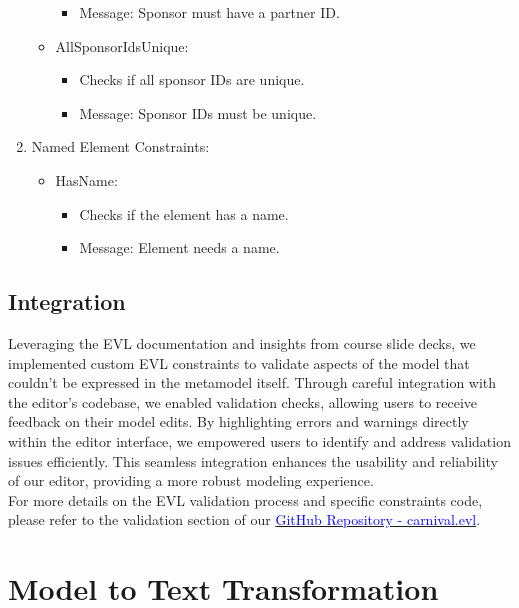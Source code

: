 \documentclass[a4paper,11pt]{report}
\begin{document}
\begin{enumerate}
\begin{itemize}
\begin{itemize}
			\item Message: Sponsor must have a partner ID.
		\end{itemize}
		\item AllSponsorIdsUnique:
		\begin{itemize}
			\item Checks if all sponsor IDs are unique.
			\item Message: Sponsor IDs must be unique.
		\end{itemize}
	\end{itemize}
	\item Named Element Constraints:
	\begin{itemize}
		\item HasName:
		\begin{itemize}
			\item Checks if the element has a name.
			\item Message: Element needs a name.
		\end{itemize}
	\end{itemize}
\end{enumerate}

\subsection{Integration}
Leveraging the EVL documentation and insights from  course slide decks, we implemented custom EVL constraints to validate aspects of the model that couldn't be expressed in the metamodel itself. Through careful integration with the editor's codebase, we enabled validation checks, allowing users to receive feedback on their model edits. By highlighting errors and warnings directly within the editor interface, we empowered users to identify and address validation issues efficiently. This seamless integration enhances the usability and reliability of our editor, providing a more robust modeling experience.\\

For more details on the EVL validation process and specific constraints code, please refer to the validation section of our \href{https://github.com/samkithkjain/cas_703/blob/main/workspace/carnival/validation/carnival.evl}{\textcolor{blue}{GitHub Repository - carnival.evl}}.

\section{Model to Text Transformation}
\end{document}
